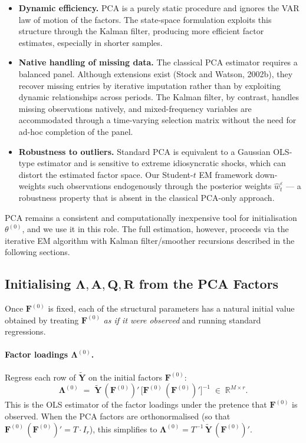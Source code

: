 \documentclass[11pt, a4paper, oneside]{article}
\newcommand{\mY}{\mathbf{Y}}
\newcommand{\mF}{\mathbf{F}}
\begin{document}
\begin{itemize}[leftmargin=1.5em, itemsep=2pt]
    \item \textbf{Dynamic efficiency.} PCA is a purely static procedure
          and ignores the VAR law of motion of the factors. The
          state-space formulation exploits this structure through the
          Kalman filter, producing more efficient factor estimates,
          especially in shorter samples.
    \item \textbf{Native handling of missing data.} The classical PCA
          estimator requires a balanced panel. Although extensions
          exist (Stock and Watson, 2002b), they recover missing
          entries by iterative imputation rather than by exploiting
          dynamic relationships across periods. The Kalman filter,
          by contrast, handles missing observations natively, and
          mixed-frequency variables are accommodated through a
          time-varying selection matrix without the need for
          ad-hoc completion of the panel.
    \item \textbf{Robustness to outliers.} Standard PCA is equivalent
          to a Gaussian OLS-type estimator and is sensitive to
          extreme idiosyncratic shocks, which can distort the
          estimated factor space. Our Student-$t$ EM framework
          down-weights such observations endogenously through the
          posterior weights $\hat{w}^\varepsilon_t$ — a robustness
          property that is absent in the classical PCA-only approach.
\end{itemize}

PCA remains a consistent and computationally inexpensive tool for
initialisation $\theta^{(0)}$, and we use it in this role. The full estimation, however,
proceeds via the iterative EM algorithm with Kalman filter/smoother
recursions described in the following sections.

\subsection{Initialising \texorpdfstring{$\bm{\Lambda, A, Q, R}$}{Lambda, A, Q, R} from the PCA Factors}

Once $\mF^{(0)}$ is fixed, each of the structural parameters has a
natural initial value obtained by treating $\mF^{(0)}$ \emph{as if it
were observed} and running standard regressions.

\paragraph{Factor loadings $\boldsymbol{\Lambda}^{(0)}$.}
Regress each row of $\tilde{\mY}$ on the initial factors $\mF^{(0)}$:
\begin{equation}
\boldsymbol{\Lambda}^{(0)} \;=\; \tilde{\mY}\,(\mF^{(0)})'\,
\big[\mF^{(0)}\,(\mF^{(0)})'\big]^{-1}
\;\in\; \mathbb{R}^{M \times r}.
\label{eq:init-Lambda}
\end{equation}
This is the OLS estimator of the factor loadings under the pretence
that $\mF^{(0)}$ is observed. When the PCA factors are orthonormalised
(so that $\mF^{(0)}\,(\mF^{(0)})' = T \cdot I_r$), this simplifies to
$\boldsymbol{\Lambda}^{(0)} = T^{-1}\,\tilde{\mY}\,(\mF^{(0)})'$.
\end{document}
